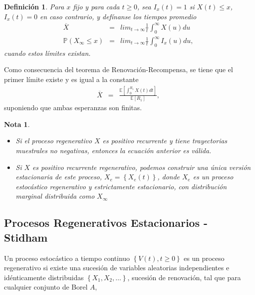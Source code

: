 \documentclass{article}
\newtheorem{Def}{Definición}
\newtheorem{Note}{Nota}
\newcommand{\esp}{\mathbb{E}}
\newcommand{\prob}{\mathbb{P}}
\begin{document}
\begin{Def}
Para $x$ fijo y para cada $t\geq0$, sea $I_{x}\left(t\right)=1$ si $X\left(t\right)\leq x$,  $I_{x}\left(t\right)=0$ en caso contrario, y def\'inanse los tiempos promedio
\begin{eqnarray*}
\overline{X}&=&lim_{t\rightarrow\infty}\frac{1}{t}\int_{0}^{\infty}X\left(u\right)du\\
\prob\left(X_{\infty}\leq x\right)&=&lim_{t\rightarrow\infty}\frac{1}{t}\int_{0}^{\infty}I_{x}\left(u\right)du,
\end{eqnarray*}
cuando estos l\'imites existan.
\end{Def}

Como consecuencia del teorema de Renovaci\'on-Recompensa, se tiene que el primer l\'imite  existe y es igual a la constante
\begin{eqnarray*}
\overline{X}&=&\frac{\esp\left[\int_{0}^{R_{1}}X\left(t\right)dt\right]}{\esp\left[R_{1}\right]},
\end{eqnarray*}
suponiendo que ambas esperanzas son finitas.

\begin{Note}
\begin{itemize}
\item[a)] Si el proceso regenerativo $X$ es positivo recurrente y tiene trayectorias muestrales no negativas, entonces la ecuaci\'on anterior es v\'alida.
\item[b)] Si $X$ es positivo recurrente regenerativo, podemos construir una \'unica versi\'on estacionaria de este proceso, $X_{e}=\left\{X_{e}\left(t\right)\right\}$, donde $X_{e}$ es un proceso estoc\'astico regenerativo y estrictamente estacionario, con distribuci\'on marginal distribuida como $X_{\infty}$
\end{itemize}
\end{Note}


\subsection{Procesos Regenerativos Estacionarios - Stidham \cite{Stidham}}


Un proceso estoc\'astico a tiempo continuo $\left\{V\left(t\right),t\geq0\right\}$ es un proceso regenerativo si existe una sucesi\'on de variables aleatorias independientes e id\'enticamente distribuidas $\left\{X_{1},X_{2},\ldots\right\}$, sucesi\'on de renovaci\'on, tal que para cualquier conjunto de Borel $A$, 
\end{document}
